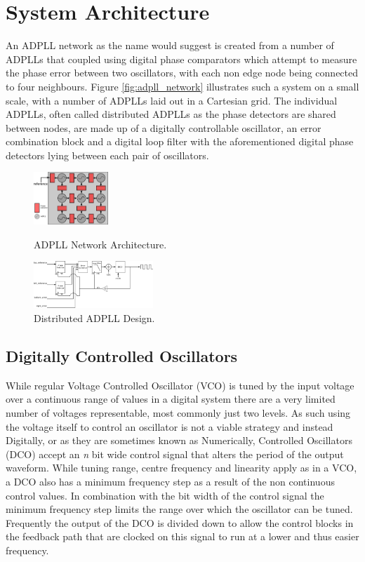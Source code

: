 \documentclass[conference]{IEEEtran}
\begin{document}
\section{System Architecture}
An ADPLL network as the name would suggest is created from a number of ADPLLs that coupled using digital phase comparators which attempt to measure the phase error between two oscillators, with each non edge node being connected to four neighbours. Figure \ref{fig:adpll_network} illustrates such a system on a small scale, with a number of ADPLLs laid out in a Cartesian grid. The individual ADPLLs, often called distributed ADPLLs as the phase detectors are shared between nodes, are made up of a digitally controllable oscillator, an error combination block and a digital loop filter with the aforementioned digital phase detectors lying between each pair of oscillators.
\begin{figure}[h]
    \centering
    \includegraphics[width=0.25\textwidth]{adpll_network}
    \caption{ADPLL Network Architecture.}
    \label{fig:adpll_network}
    \vspace{0.5cm}
    \includegraphics[width=0.4\textwidth]{dist_adpll}
    \caption{Distributed ADPLL Design.}
    \label{fig:adpll_base}
\end{figure}
\subsection{Digitally Controlled Oscillators}
While regular Voltage Controlled Oscillator (VCO) is tuned by the input voltage over a continuous range of values in a digital system there are a very limited number of voltages representable, most commonly just two levels. As such using the voltage itself to control an oscillator is not a viable strategy and instead Digitally, or as they are sometimes known as Numerically, Controlled Oscillators (DCO) accept an \textit{n} bit wide control signal that alters the period of the output waveform. While tuning range, centre frequency and linearity apply as in a VCO, a DCO also has a minimum frequency step as a result of the non continuous control values. %
In combination with the bit width of the control signal the minimum frequency step limits the range over which the oscillator can be tuned. Frequently the output of the DCO is divided down to allow the control blocks in the feedback path that are clocked on this signal to run at a lower and thus easier frequency.
\end{document}
